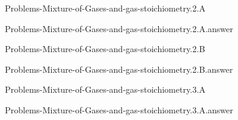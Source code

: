 \documentclass[main.tex]{subfiles}
\newcommand\chapterlabel{}
\begin{document}
\renewcommand\chapterlabel{Ch-Gas}
\begin{question}[ID=\the\value{numA}]
{Problems-Mixture-of-Gases-and-gas-stoichiometry.2.A}
\end{question}
   \begin{Form}
   \TextField[multiline,backgroundcolor=gray!20,borderwidth=0,width=0.43\textwidth  ,height=115pt, name=\the\value{numA}]  { }\end{Form}
\begin{solution}
{Problems-Mixture-of-Gases-and-gas-stoichiometry.2.A.answer}
\hspace{0.1cm}
\end{solution}


\renewcommand\chapterlabel{Ch-Gas}
\begin{question}[ID=\the\value{numA}]
{Problems-Mixture-of-Gases-and-gas-stoichiometry.2.B}
\end{question}
   \begin{Form}
   \TextField[multiline,backgroundcolor=gray!20,borderwidth=0,width=0.43\textwidth  ,height=115pt, name=\the\value{numA}]  { }\end{Form}
\begin{solution}
{Problems-Mixture-of-Gases-and-gas-stoichiometry.2.B.answer}
\hspace{0.1cm}
\end{solution}


\renewcommand\chapterlabel{Ch-Gas}
\begin{question}[ID=\the\value{numA}]
{Problems-Mixture-of-Gases-and-gas-stoichiometry.3.A}
\end{question}
   \begin{Form}
   \TextField[multiline,backgroundcolor=gray!20,borderwidth=0,width=0.43\textwidth  ,height=115pt, name=\the\value{numA}]  { }\end{Form}
\begin{solution}
{Problems-Mixture-of-Gases-and-gas-stoichiometry.3.A.answer}
\hspace{0.1cm}
\end{solution}
\end{document}
